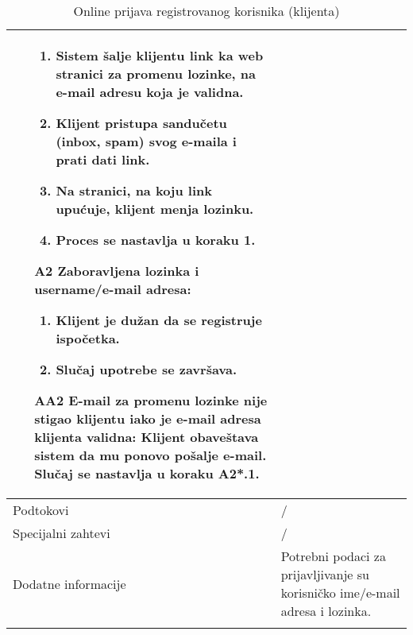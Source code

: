 \documentclass[../main.tex]{subfiles}
\begin{document}
\begin{longtable}{| p{} | p{} |}
\begin{itemize}
\begin{enumerate}
    \item Sistem šalje klijentu link ka web stranici za promenu lozinke, na e-mail adresu koja je validna.
    \item Klijent pristupa sandučetu (inbox, spam) svog e-maila i prati dati link.
    \item Na stranici, na koju link upućuje, klijent menja lozinku.
    \item Proces se nastavlja u koraku 1.
    \end{enumerate}
    \item [A2] Zaboravljena lozinka i username/e-mail adresa: \begin{enumerate}
    \item Klijent je dužan da se registruje ispočetka.
    \item Slučaj upotrebe se završava.
    \end{enumerate} %
    \item [AA2] E-mail za promenu lozinke nije stigao klijentu iako je e-mail adresa klijenta validna: Klijent obaveštava sistem da mu ponovo pošalje e-mail. Slučaj se nastavlja u koraku A2*.1.
    \end{itemize}\\ %
\hline
    Podtokovi & / \\
\hline
    Specijalni zahtevi & / \\
\hline
    Dodatne informacije & Potrebni podaci za prijavljivanje su korisničko ime/e-mail adresa i lozinka. \\
\hline

\caption{Online prijava registrovanog korisnika (klijenta)}
\end{longtable}
\end{document}
